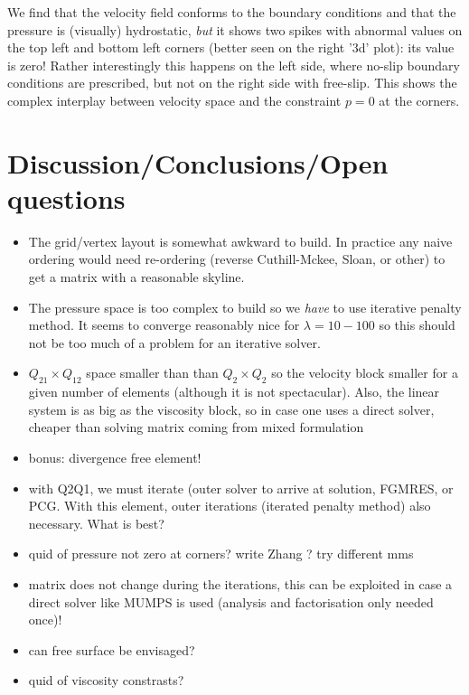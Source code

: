 We find that the velocity field conforms to the boundary conditions and that 
the pressure is (visually) hydrostatic, {\it but} it shows two spikes with abnormal 
values on the top left and bottom left corners (better seen on the right '3d' plot): 
its value is zero! Rather 
interestingly this happens on the left side, where no-slip boundary 
conditions are prescribed, but not on the right side with free-slip.
This shows the complex interplay between velocity space and the 
constraint $p=0$ at the corners.



\newpage
\section*{Discussion/Conclusions/Open questions}

\begin{itemize}

\item The grid/vertex layout is somewhat awkward to build. In practice any naive ordering 
would need re-ordering (reverse Cuthill-Mckee, Sloan, or other) to get a matrix with a reasonable skyline.

\item The pressure space is too complex to build so we {\it have} to use iterative penalty method. 
It seems to converge reasonably nice for $\lambda=10-100$ so this should not 
be too much of a problem for an iterative solver.

\item $Q_{21}\times Q_{12}$ space smaller than than $Q_2\times Q_2$ so the velocity
block smaller for a given number of elements (although it is not spectacular). 
Also, the linear system is as big as the viscosity block, so in case one uses 
a direct solver, cheaper than solving matrix coming from mixed formulation

\item bonus: divergence free element!

\item with Q2Q1, we must iterate (outer solver to arrive at solution, FGMRES, or PCG. 
With this element, outer iterations (iterated penalty method) also necessary. What is best?

\item quid of pressure not zero at corners? write Zhang ? try different mms 

\item matrix does not change during the iterations, this can be exploited in case a direct solver
like MUMPS is used (analysis and factorisation only needed once)!

\item can free surface be envisaged?

\item quid of viscosity constrasts? 

\end{itemize}

